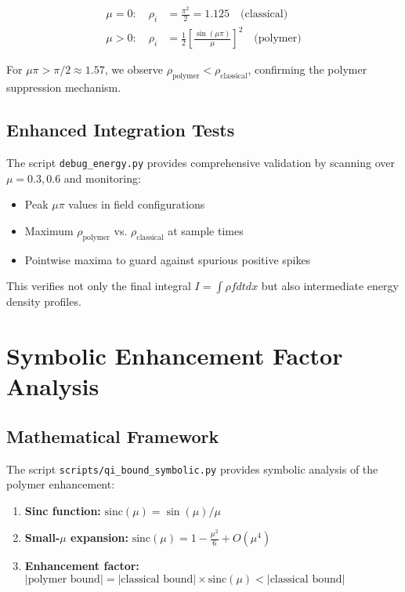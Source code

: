 \documentclass[11pt]{article}
\begin{document}
\begin{align}
\mu = 0: \quad \rho_i &= \frac{\pi^2}{2} = 1.125 \quad \text{(classical)} \\
\mu > 0: \quad \rho_i &= \frac{1}{2}\left[\frac{\sin(\mu\pi)}{\mu}\right]^2 \quad \text{(polymer)}
\end{align}

For $\mu\pi > \pi/2 \approx 1.57$, we observe $\rho_{\text{polymer}} < \rho_{\text{classical}}$, confirming the polymer suppression mechanism.

\subsection{Enhanced Integration Tests}
The script \texttt{debug\_energy.py} provides comprehensive validation by scanning over $\mu = 0.3, 0.6$ and monitoring:
\begin{itemize}
\item Peak $\mu\pi$ values in field configurations
\item Maximum $\rho_{\text{polymer}}$ vs. $\rho_{\text{classical}}$ at sample times
\item Pointwise maxima to guard against spurious positive spikes
\end{itemize}

This verifies not only the final integral $I = \int\rho f dt dx$ but also intermediate energy density profiles.

\section{Symbolic Enhancement Factor Analysis}

\subsection{Mathematical Framework}
The script \texttt{scripts/qi\_bound\_symbolic.py} provides symbolic analysis of the polymer enhancement:

\begin{enumerate}
\item \textbf{Sinc function:} $\text{sinc}(\mu) = \sin(\mu)/\mu$
\item \textbf{Small-$\mu$ expansion:} $\text{sinc}(\mu) = 1 - \frac{\mu^2}{6} + O(\mu^4)$
\item \textbf{Enhancement factor:} $|\text{polymer bound}| = |\text{classical bound}| \times \text{sinc}(\mu) < |\text{classical bound}|$
\end{enumerate}
\end{document}

